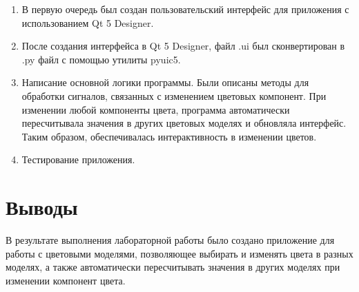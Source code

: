 \documentclass{article}
\begin{document}
    \begin{enumerate}
        \item В первую очередь был создан пользовательский интерфейс для приложения с использованием Qt 5 Designer.

        \item После создания интерфейса в Qt 5 Designer, файл .ui был сконвертирован в .py файл с помощью утилиты pyuic5.

        \item Написание основной логики программы.
        Были описаны методы для обработки сигналов, связанных с изменением цветовых компонент.
        При изменении любой компоненты цвета, программа автоматически пересчитывала значения в других цветовых моделях и обновляла интерфейс.
        Таким образом, обеспечивалась интерактивность в изменении цветов.
        \item Тестирование приложения.

    \end{enumerate}

    \section{Выводы}
    В результате выполнения лабораторной работы было создано приложение для работы с цветовыми моделями, позволяющее выбирать и изменять цвета в разных моделях, а также автоматически пересчитывать значения в других моделях при изменении компонент цвета.
\end{document}
